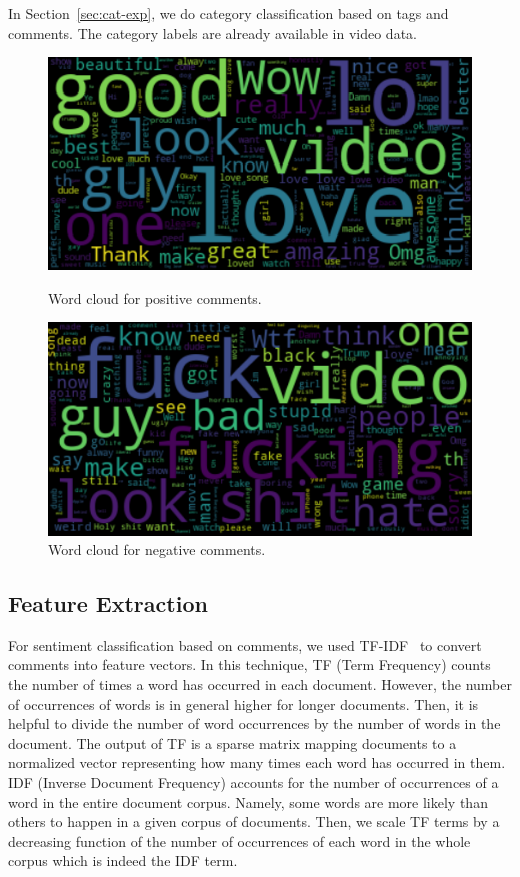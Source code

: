 In Section~\ref{sec:cat-exp}, we do category classification based on tags and comments. The category labels are already available in video data.
\begin{figure}[h]
\centering
\begin{minipage}{0.49\textwidth}
\centering
\includegraphics[width=1.0\linewidth]{figures/pos_WordCloud.png}
\caption{Word cloud for positive comments.}
\label{fig:poscloud}
\end{minipage}
\begin{minipage}{0.49\textwidth}
\centering
\includegraphics[width=1.0\linewidth]{figures/neg_WordCloud.png}
\caption{Word cloud for negative comments.}
\label{fig:negcloud}
\end{minipage}
\end{figure}

\subsection{Feature Extraction}
\label{sec:feature}
For sentiment classification based on comments, we used TF-IDF~\cite{massiveDatasets} to convert comments into feature vectors. In this technique, TF (Term Frequency) counts the number of times a word has occurred in each document. However, the number of occurrences of words is in general higher for longer documents. Then, it is helpful to divide the number of word occurrences by the number of words in the document. The output of TF is a sparse matrix mapping documents to a normalized vector representing how many times each word has occurred in them. IDF (Inverse Document Frequency) accounts for the number of occurrences of a word in the entire document corpus. Namely, some words are more likely than others to happen in a given corpus of documents. Then, we scale TF terms by a decreasing function of the number of occurrences of each word in the whole corpus which is indeed the IDF term.

